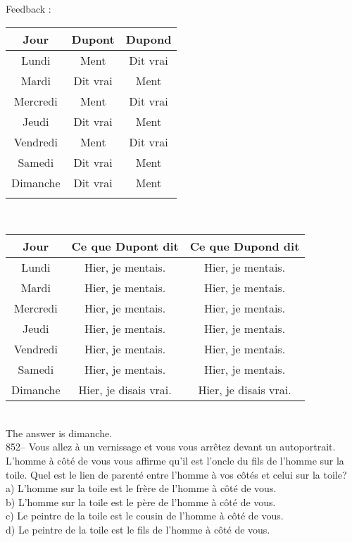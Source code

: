 \documentclass[letterpaper, 12pt]{article}
\begin{document}
Feedback : \\
\begin{tabular}{|c|c|c|} \hline
{\bf Jour} & {\bf Dupont} & {\bf Dupond} \\ \hline \hline

Lundi     & Ment  &  Dit vrai      \\ \hline
Mardi     & Dit vrai      &  Ment  \\ \hline
Mercredi  & Ment  &  Dit vrai      \\ \hline
Jeudi     & Dit vrai      &  Ment  \\ \hline
Vendredi  & Ment  &  Dit vrai      \\ \hline
Samedi    & Dit vrai      &  Ment  \\ \hline
Dimanche  & Dit vrai  &  Ment      \\ \hline
\multicolumn{3}{c}{}\\
\end{tabular}\\

\begin{tabular}{|c|c|c|} \hline
{\bf Jour} & {\bf Ce que Dupont dit } & {\bf Ce que Dupond dit } \\ \hline
\hline

Lundi     & Hier, je mentais.       &  Hier, je mentais.   \\ \hline
Mardi     & Hier, je mentais.      &  Hier, je mentais.       \\
\hline Mercredi  & Hier, je mentais.      &  Hier, je mentais.
\\ \hline Jeudi     & Hier, je mentais.      &  Hier, je mentais.
\\ \hline Vendredi  & Hier, je mentais.      &  Hier, je mentais.
\\ \hline Samedi    & Hier, je mentais.      &  Hier, je mentais.
\\ \hline Dimanche  & Hier, je disais vrai.  &  Hier, je disais
vrai.       \\ \hline
\end{tabular}\\

The answer is dimanche.  \\

852-- Vous allez \`a un vernissage et vous vous arr\^etez devant un
autoportrait.  L'homme \`a c\^ot\'e de vous vous affirme qu'il est l'oncle
du fils de l'homme sur la toile.  Quel est le lien de parent\'e entre
l'homme \`a vos c\^ot\'es et celui sur la toile?\\
a) L'homme sur la toile est le fr\`ere de l'homme \`a c\^ot\'e de vous.\\
b) L'homme sur la toile est le p\`ere de l'homme \`a c\^ot\'e de vous.\\
c) Le peintre de la toile est le cousin de l'homme \`a c\^ot\'e de vous.\\
d) Le peintre de la toile est le fils de l'homme \`a c\^ot\'e de vous.\\
\end{document}
